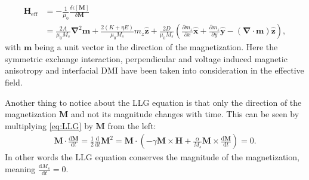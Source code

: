 \begin{align}
\label{eq:EffectiveField}
\nonumber\mathbold{H}_{\textrm{eff}} &= -\frac{1}{\mu_0}\frac{\delta\epsilon[\mathbold{M}]}{\delta\mathbold{M}} \\
&= \frac{2A}{\mu_0M_s}\mathbold{\nabla}^2\mathbold{m}+\frac{2(K+\eta E)}{\mu_0M_s}m_z\mathbold{\hat{z}} + \frac{2D}{\mu_0M_s}\left(\frac{\partial m_z}{\partial x}\mathbold{\hat{x}}+\frac{\partial m_z}{\partial y}\mathbold{\hat{y}}-(\mathbold{\nabla}\cdot\mathbold{m})\mathbold{\hat{z}}\right),
\end{align}
with $\mathbold{m}$ being a unit vector in the direction of the magnetization. Here the symmetric exchange interaction, perpendicular and voltage induced magnetic anisotropy and interfacial DMI have been taken into consideration in the effective field.

Another thing to notice about the LLG equation is that only the direction of the magnetization $\mathbold{M}$ and not its magnitude changes with time. This can be seen by multiplying \eqref{eq:LLG} by $\mathbold{M}$ from the left:
\begin{align}
\mathbold{M}\cdot\frac{\textrm{d}\mathbold{M}}{\textrm{d}t} = \frac{1}{2}\frac{\textrm{d}}{\textrm{d}t} \mathbold{M}^2 =  \mathbold{M}\cdot\left(-\gamma\mathbold{M}\times\mathbold{H}+\frac{\alpha}{M_s}\mathbold{M}\times\frac{\textrm{d}\mathbold{M}}{\textrm{d}t}\right) = 0.
\end{align}
In other words the LLG equation conserves the magnitude of the magnetization, meaning $\frac{\textrm{d} M_s}{\textrm{d}t} = 0$.

